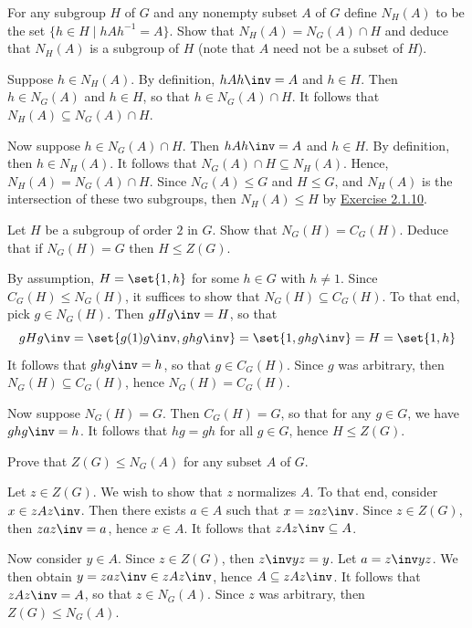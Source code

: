 \begin{exercise} \label{ex2.2.9}
    For any subgroup $H$ of $G$ and any nonempty subset $A$ of $G$ define $N_H(A)$ to be the set $\{h \in H \mid hAh^{-1} = A\}$. Show that $N_H(A) = N_G(A) \cap H$ and deduce that $N_H(A)$ is a subgroup of $H$ (note that $A$ need not be a subset of $H$).
\end{exercise}

\begin{sol}
    Suppose $h \in N_H(A)$. By definition, $hAh\inv = A$ and $h \in H$. Then $h \in N_G(A)$ and $h \in H$, so that $h \in N_G(A) \cap H$. It follows that $N_H(A) \subseteq N_G(A) \cap H$.

    Now suppose $h \in N_G(A) \cap H$. Then $hAh\inv = A$ and $h \in H$. By definition, then $h \in N_H(A)$. It follows that $N_G(A) \cap H \subseteq N_H(A)$. Hence, $N_H(A) = N_G(A) \cap H$. Since $N_G(A) \leq G$ and $H \leq G$, and $N_H(A)$ is the intersection of these two subgroups, then $N_H(A) \leq H$ by \hyperref[ex2.1.10]{Exercise 2.1.10}.
\end{sol}


\begin{exercise} \label{ex2.2.10}
    Let $H$ be a subgroup of order $2$ in $G$. Show that $N_G(H) = C_G(H)$. Deduce that if $N_G(H) = G$ then $H \le Z(G)$.
\end{exercise}

\begin{sol}
    By assumption, $H = \set{1, h}$ for some $h \in G$ with $h \neq 1$. Since $C_G(H) \leq N_G(H)$, it suffices to show that $N_G(H) \subseteq C_G(H)$. To that end, pick $g \in N_G(H)$. Then $gHg\inv = H$, so that
    \[gHg\inv = \set{g(1)g\inv, g h g\inv} = \set{1, g h g\inv} = H = \set{1, h}\]
    It follows that $g h g\inv = h$, so that $g \in C_G(H)$. Since $g$ was arbitrary, then $N_G(H) \subseteq C_G(H)$, hence $N_G(H) = C_G(H)$.

    Now suppose $N_G(H) = G$. Then $C_G(H) = G$, so that for any $g \in G$, we have $g h g\inv = h$. It follows that $h g = g h$ for all $g \in G$, hence $H \leq Z(G)$.
\end{sol}

\begin{exercise} \label{ex2.2.11}
    Prove that $Z(G)\le N_G(A)$ for any subset $A$ of $G$.
\end{exercise}

\begin{sol}
    Let $z \in Z(G)$. We wish to show that $z$ normalizes $A$. To that end, consider $x \in z A z\inv$. Then there exists $a \in A$ such that $x = z a z\inv$. Since $z \in Z(G)$, then $z a z\inv = a$, hence $x \in A$. It follows that $z A z\inv \subseteq A$.

    Now consider $y \in A$. Since $z \in Z(G)$, then $z\inv y z = y$. Let $a = z\inv y z$. We then obtain $y = z a z\inv \in z A z\inv$, hence $A \subseteq z A z\inv$. It follows that $z A z\inv = A$, so that $z \in N_G(A)$. Since $z$ was arbitrary, then $Z(G) \leq N_G(A)$.
\end{sol}

